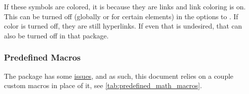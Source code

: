 If these symbols are colored, it is because they are links and link coloring is on.
This can be turned off (globally or for certain elements) in the options to
.
If color is turned off, they are still hyperlinks.
If even that is undesired, that can also be turned off in that package.

\subsubsection{Predefined Macros}

The  package has some
\href{https://tex.stackexchange.com/q/471532/120853}{issues},
and as such, this document relies on a couple custom macros in place of it, see
\cref{tab:predefined_math_macros}.

\begin{table}
\end{table}
